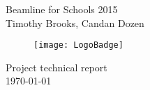 \begin{center}
{\LARGE Beamline for Schools 2015\\}
\vspace{2cm}
{\Large Timothy Brooks, Candan Dozen\\}

\end{center}
\vspace{1cm}

\capstartfalse{}
\begin{figure}[ht]
\begin{center}
\texttt{[image: LogoBadge]}
\end{center}
\end{figure}

\begin{center}
\vspace{2cm}
{\LARGE Project technical report\\}
\vspace{1cm}
{\today\\}
\end{center}
